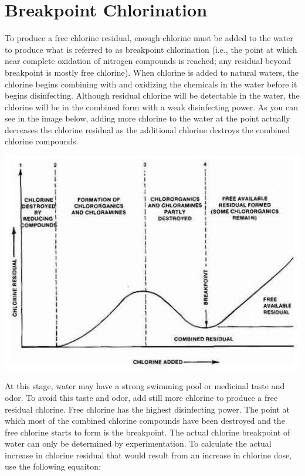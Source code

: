 \documentclass[10pt]{article}
\begin{document}
\section{Breakpoint Chlorination}
To produce a free chlorine residual, enough chlorine must be added to the water to produce what is referred to as breakpoint chlorination (i.e., the point at which near complete oxidation of nitrogen compounds is reached; any residual beyond breakpoint is mostly free chlorine). When chlorine is added to natural waters, the chlorine begins combining with and oxidizing the chemicals in the water before it begins disinfecting. Although residual chlorine will be detectable in the water, the chlorine will be in the combined form with a weak disinfecting power. As you can see in the image below, adding more chlorine to the water at the point actually decreases the chlorine residual as the additional chlorine destroys the combined chlorine compounds.

\includegraphics[max width=\textwidth]{2022_10_14_eba0aec33b37be0fbdf2g-05}

At this stage, water may have a strong swimming pool or medicinal taste and odor. To avoid this taste and odor, add still more chlorine to produce a free residual chlorine. Free chlorine has the highest disinfecting power. The point at which most of the combined chlorine compounds have been destroyed and the free chlorine starts to form is the breakpoint. The actual chlorine breakpoint of water can only be determined by experimentation. To calculate the actual increase in chlorine residual that would result from an increase in chlorine dose, use the following equaiton:
\end{document}
